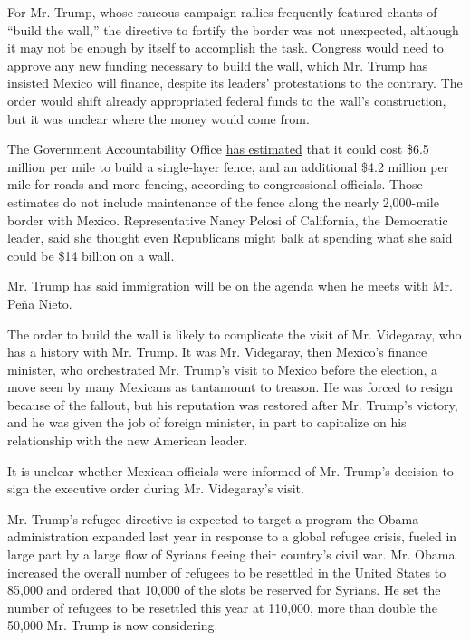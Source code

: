 For Mr. Trump, whose raucous campaign rallies frequently featured chants
of ``build the wall,'' the directive to fortify the border was not
unexpected, although it may not be enough by itself to accomplish the
task. Congress would need to approve any new funding necessary to build
the wall, which Mr. Trump has insisted Mexico will finance, despite its
leaders' protestations to the contrary. The order would shift already
appropriated federal funds to the wall's construction, but it was
unclear where the money would come from.

The Government Accountability Office
\href{https://www.nytimes.com/2017/01/06/us/politics/trump-wall-mexico.html}{has
estimated} that it could cost \$6.5 million per mile to build a
single-layer fence, and an additional \$4.2 million per mile for roads
and more fencing, according to congressional officials. Those estimates
do not include maintenance of the fence along the nearly 2,000-mile
border with Mexico. Representative Nancy Pelosi of California, the
Democratic leader, said she thought even Republicans might balk at
spending what she said could be \$14 billion on a wall.

Mr. Trump has said immigration will be on the agenda when he meets with
Mr. Peña Nieto.

The order to build the wall is likely to complicate the visit of Mr.
Videgaray, who has a history with Mr. Trump. It was Mr. Videgaray, then
Mexico's finance minister, who orchestrated Mr. Trump's visit to Mexico
before the election, a move seen by many Mexicans as tantamount to
treason. He was forced to resign because of the fallout, but his
reputation was restored after Mr. Trump's victory, and he was given the
job of foreign minister, in part to capitalize on his relationship with
the new American leader.

It is unclear whether Mexican officials were informed of Mr. Trump's
decision to sign the executive order during Mr. Videgaray's visit.

Mr. Trump's refugee directive is expected to target a program the Obama
administration expanded last year in response to a global refugee
crisis, fueled in large part by a large flow of Syrians fleeing their
country's civil war. Mr. Obama increased the overall number of refugees
to be resettled in the United States to 85,000 and ordered that 10,000
of the slots be reserved for Syrians. He set the number of refugees to
be resettled this year at 110,000, more than double the 50,000 Mr. Trump
is now considering.

